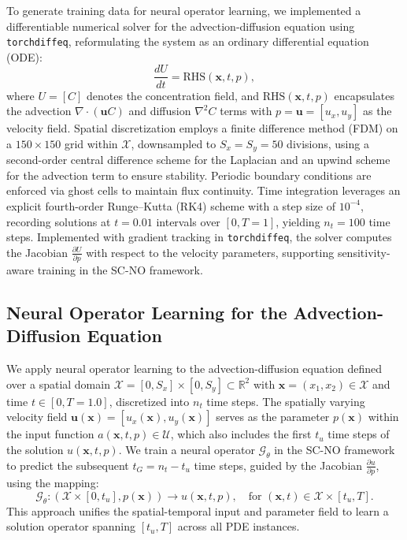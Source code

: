 To generate training data for neural operator learning, we implemented a differentiable numerical solver for the advection-diffusion equation using \texttt{torchdiffeq}, reformulating the system as an ordinary differential equation (ODE):
\begin{equation}
\frac{dU}{dt} = \text{RHS}(\mathbf{x}, t, p),
\end{equation}
where \( U = [C] \) denotes the concentration field, and \( \text{RHS}(\mathbf{x}, t, p) \) encapsulates the advection \( \nabla \cdot (\mathbf{u}C) \) and diffusion \( \nabla^2 C \) terms with \( p = \mathbf{u} = [u_x, u_y] \) as the velocity field. Spatial discretization employs a finite difference method (FDM) on a \( 150 \times 150 \) grid within \( \mathcal{X} \), downsampled to \( S_x = S_y = 50 \) divisions, using a second-order central difference scheme for the Laplacian and an upwind scheme for the advection term to ensure stability. Periodic boundary conditions are enforced via ghost cells to maintain flux continuity. Time integration leverages an explicit fourth-order Runge–Kutta (RK4) scheme with a step size of \( 10^{-4} \), recording solutions at \( t = 0.01 \) intervals over \( [0, T = 1] \), yielding \( n_t = 100 \) time steps. Implemented with gradient tracking in \texttt{torchdiffeq}, the solver computes the Jacobian \( \frac{\partial U}{\partial p} \) with respect to the velocity parameters, supporting sensitivity-aware training in the SC-NO framework.




\subsection*{Neural Operator Learning for the Advection-Diffusion Equation}

We apply neural operator learning to the advection-diffusion equation defined over a spatial domain \( \mathcal{X} = [0, S_x] \times [0, S_y] \subset \mathbb{R}^2 \) with \( \mathbf{x} = (x_1, x_2) \in \mathcal{X} \) and time \( t \in [0, T=1.0] \), discretized into \( n_t \) time steps. The spatially varying velocity field \( \mathbf{u}(\mathbf{x}) = [u_x(\mathbf{x}), u_y(\mathbf{x})] \) serves as the parameter \( p(\mathbf{x}) \) within the input function \( a(\mathbf{x}, t, p) \in \mathcal{U} \), which also includes the first \( t_u \) time steps of the solution \( u(\mathbf{x}, t, p) \). We train a neural operator \( \mathcal{G}_\theta \) in the SC-NO framework to predict the subsequent \( t_G = n_t - t_u \) time steps, guided by the Jacobian \( \frac{\partial u}{\partial p} \), using the mapping:
\begin{equation}
\mathcal{G}_\theta: \left( \mathcal{X} \times [0, t_u], p(\mathbf{x}) \right) \to u(\mathbf{x}, t, p), \quad \text{for } (\mathbf{x}, t) \in \mathcal{X} \times [t_u, T].
\end{equation}
This approach unifies the spatial-temporal input and parameter field to learn a solution operator spanning \( [t_u, T] \) across all PDE instances.


